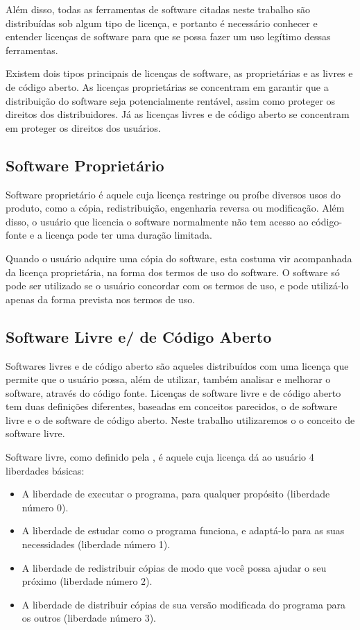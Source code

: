 Além disso, todas as ferramentas de software citadas neste trabalho são distribuídas sob algum tipo de licença, e portanto é necessário conhecer e entender licenças de software para que se possa fazer um uso legítimo dessas ferramentas.

Existem dois tipos principais de licenças de software, as proprietárias e as livres e de código aberto. As licenças proprietárias se concentram em garantir que a distribuição do software seja potencialmente rentável, assim como proteger os direitos dos distribuidores. Já as licenças livres e de código aberto se concentram em proteger os direitos dos usuários.

\subsection{Software Proprietário} 

Software proprietário é aquele cuja licença restringe ou proíbe diversos usos do produto, como a cópia, redistribuição, engenharia reversa ou modificação. Além disso, o usuário que licencia o software normalmente não tem acesso ao código-fonte e a licença pode ter uma duração limitada.

Quando o usuário adquire uma cópia do software, esta costuma vir acompanhada da licença proprietária, na forma dos termos de uso do software. O software só pode ser utilizado se o usuário concordar com os termos de uso, e pode utilizá-lo apenas da forma prevista nos termos de uso.

\subsection{Software Livre e/ de Código Aberto}

Softwares livres e de código aberto são aqueles distribuídos com uma licença que permite que o usuário possa, além de utilizar, também analisar e melhorar o software, através do código fonte. Licenças de software livre e de código aberto tem duas definições diferentes, baseadas em conceitos parecidos, o de software livre e o de software de código aberto. Neste trabalho utilizaremos o o conceito de software livre.

Software livre, como definido pela , é aquele cuja licença dá ao usuário 4 liberdades básicas\cite{GNUFreeSoftware}:

\begin{itemize}

\item A liberdade de executar o programa, para qualquer propósito (liberdade número 0).
\item A liberdade de estudar como o programa funciona, e adaptá-lo para as suas necessidades (liberdade número 1).
\item A liberdade de redistribuir cópias de modo que você possa ajudar o seu próximo (liberdade número 2).
\item A liberdade de distribuir cópias de sua versão modificada do programa para os outros (liberdade número 3).

\end{itemize}

